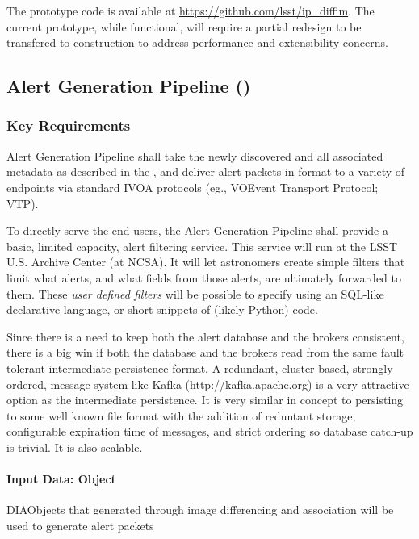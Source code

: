 The prototype code is available at \url{https://github.com/lsst/ip_diffim}. The current prototype, while functional, will require a partial redesign to be transfered to construction to address performance and extensibility concerns.

\clearpage

\subsection{Alert Generation Pipeline (\wbsAP)}

\subsubsection{Key Requirements}

Alert Generation Pipeline shall take the newly discovered \DIASources and all associated metadata as described in the \DPDD, and deliver alert packets in \VOEvent format to a variety of endpoints via standard IVOA protocols (eg., VOEvent Transport Protocol; VTP\@).

To directly serve the end-users, the Alert Generation Pipeline shall provide a basic, limited capacity, alert filtering service. This service will run at the LSST U.S. Archive Center (at NCSA). It will let astronomers create simple filters that limit what alerts, and what fields from those alerts, are ultimately forwarded to them. These \emph{user defined filters} will be possible to specify using an SQL-like declarative language, or short snippets of (likely Python) code.

Since there is a need to keep both the alert database and the brokers consistent, there is a big win if both the database and the brokers read from the same fault tolerant intermediate persistence format.  A redundant, cluster based, strongly ordered, message system like Kafka (http://kafka.apache.org) is a very attractive option as the intermediate persistence.  It is very similar in concept to persisting to some well known file format with the addition of reduntant storage, configurable expiration time of messages, and strict ordering so database catch-up is trivial.  It is also scalable.


\paragraph{Input Data: Object}

DIAObjects that generated through image differencing and association will be used to generate alert packets 

